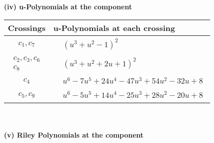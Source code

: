 \documentclass[1p]{elsarticle_modified}
\theoremstyle{definition}
\begin{document}
\newpage\renewcommand{\arraystretch}{1}
\flushleft \textbf{(iv) u-Polynomials at the component}\newline \\
\begin{tabular}{m{50pt}|m{274pt}}
Crossings & \hspace{64pt}u-Polynomials at each crossing \\
\hline $$\begin{aligned}c_{1},c_{7}\end{aligned}$$&$\begin{aligned}
&(u^3+u^2-1)^2
\end{aligned}$\\
\hline $$\begin{aligned}c_{2},c_{3},c_{6}\\c_{8}\end{aligned}$$&$\begin{aligned}
&(u^3+u^2+2 u+1)^2
\end{aligned}$\\
\hline $$\begin{aligned}c_{4}\end{aligned}$$&$\begin{aligned}
&u^6-7 u^5+24 u^4-47 u^3+54 u^2-32 u+8
\end{aligned}$\\
\hline $$\begin{aligned}c_{5},c_{9}\end{aligned}$$&$\begin{aligned}
&u^6-5 u^5+14 u^4-25 u^3+28 u^2-20 u+8
\end{aligned}$\\
\hline
\end{tabular}\\~\\
\newpage\renewcommand{\arraystretch}{1}
\flushleft \textbf{(v) Riley Polynomials at the component}\newline \\
\end{document}
